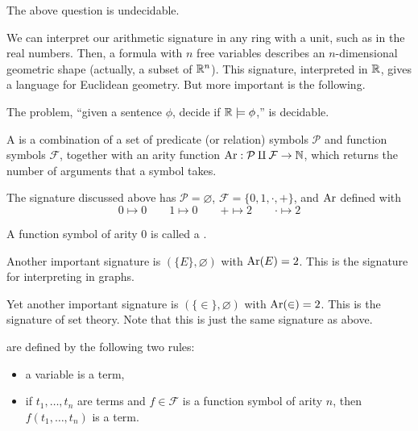 \begin{theorem}
  The above question is undecidable.
\end{theorem}

We can interpret our arithmetic signature in any ring with a unit, such as in
the real numbers.
Then, a formula with $n$ free variables describes an $n$-dimensional geometric
shape (actually, a subset of $\mathbb{R}^n$).
This signature, interpreted in $\mathbb{R}$, gives a language for Euclidean geometry.
But more important is the following.

\begin{theorem}[Tarski]
  The problem, \enquote{given a sentence $\phi$, decide if $\mathbb{R} \models \phi$,}
  is decidable.
\end{theorem}

\begin{definition}
  A  is a combination of a set of predicate (or relation)
  symbols $\mathcal{P}$ and function symbols $\mathcal{F}$, together with an
  arity function $\operatorname{Ar}: \mathcal{P} \amalg \mathcal{F} \to \mathbb{N}$, which returns the
  number of arguments that a symbol takes.
\end{definition}

\begin{example}
  The signature discussed above has $\mathcal{P} = \varnothing$, $\mathcal{F} =
  \{ 0, 1, \cdot, + \}$, and $\operatorname{Ar}$ defined with
  \begin{equation*}
	0 \mapsto 0 \qquad
	1 \mapsto 0 \qquad
	+ \mapsto 2 \qquad
	\cdot \mapsto 2
  \end{equation*}
\end{example}

\begin{definition}
  A function symbol of arity $0$ is called a .
\end{definition}

\begin{example}
  Another important signature is $(\{E\}, \varnothing)$ with $\operatorname{Ar}(E) = 2$.
  This is the signature for interpreting in graphs.
\end{example}

\begin{example}
  Yet another important signature is $(\{\in\}, \varnothing)$ with
  $\operatorname{Ar}(\in) = 2$.
  This is the signature of set theory.
  Note that this is just the same signature as above.
\end{example}

\begin{definition}
   are defined by the following two rules:
  \begin{itemize}
  \item a variable is a term,
  \item if $t_1, \ldots, t_n$ are terms and $f \in \mathcal{F}$ is a function
	symbol of arity $n$, then $f(t_1, \ldots, t_n)$ is a term.
  \end{itemize}
\end{definition}

